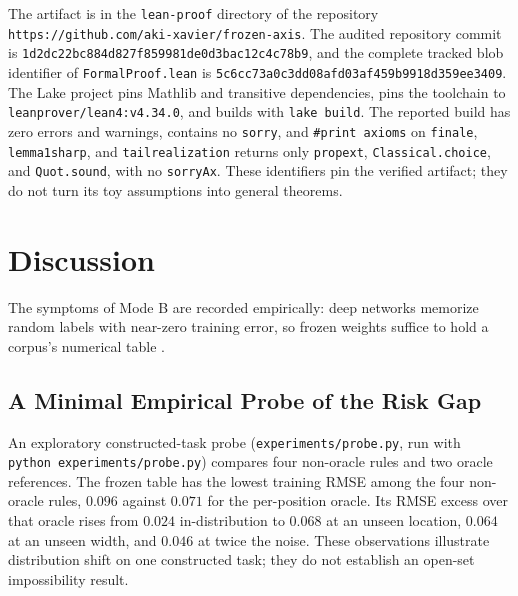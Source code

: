 \documentclass[twoside,11pt]{article}
\newcommand{\ttu}{\textunderscore\allowbreak}
\begin{document}
The artifact is in the \texttt{lean-proof} directory of the repository \texttt{https://github.com/\hspace{0pt}aki-xavier/\hspace{0pt}frozen-axis}. The audited repository commit is \texttt{1d2dc22b\allowbreak c884d827\allowbreak f859981d\allowbreak e0d3bac1\allowbreak 2c4c78b9}, and the complete tracked blob identifier of \texttt{FormalProof.lean} is \texttt{5c6cc73a\allowbreak 0c3dd08a\allowbreak fd03af45\allowbreak 9b9918d3\allowbreak 59ee3409}. The Lake project pins Mathlib and transitive dependencies, pins the toolchain to \texttt{leanprover/}\allowbreak\texttt{lean4:v4.34.0}, and builds with \texttt{lake build}. The reported build has zero errors and warnings, contains no \texttt{sorry}, and \texttt{\#print axioms} on \texttt{finale}, \texttt{lemma1\ttu sharp}, and \texttt{tail\ttu realization} returns only \texttt{propext}, \texttt{Classical.choice}, and \texttt{Quot.sound}, with no \texttt{sorryAx}. These identifiers pin the verified artifact; they do not turn its toy assumptions into general theorems.

\section{Discussion}
\label{ch:discussion}

The symptoms of Mode B are recorded empirically: deep networks memorize random labels with near-zero training error, so frozen weights suffice to hold a corpus's numerical table \citep{zhang2021}.

\subsection{A Minimal Empirical Probe of the Risk Gap}
\label{sec:probe}

An exploratory constructed-task probe (\texttt{experiments/}\allowbreak\texttt{probe.py}, run with \texttt{python}\ \allowbreak\texttt{experiments/}\allowbreak\texttt{probe.py}) compares four non-oracle rules and two oracle references. The frozen table has the lowest training RMSE among the four non-oracle rules, $0.096$ against $0.071$ for the per-position oracle. Its RMSE excess over that oracle rises from $0.024$ in-distribution to $0.068$ at an unseen location, $0.064$ at an unseen width, and $0.046$ at twice the noise. These observations illustrate distribution shift on one constructed task; they do not establish an open-set impossibility result.
\end{document}
